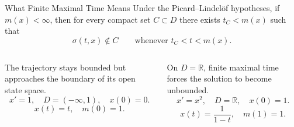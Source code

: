 \documentclass[aspectratio=169,11pt]{beamer}
\newcommand{\R}{\mathbb{R}}
\newcommand{\mstop}{m}
\newcommand{\flow}{\sigma}
\begin{document}
\begin{frame}{What Finite Maximal Time Means}
\small
Under the Picard--Lindel\"of hypotheses, if \(\mstop(x)<\infty\), then for every compact set \(C\subset D\) there exists \(t_C<\mstop(x)\) such that
\[
\boxed{\flow(t,x)\notin C
\qquad\text{whenever }t_C<t<\mstop(x).}
\]

\vspace{0.5em}
\begin{columns}[T,onlytextwidth]
\begin{tcolorbox}[colback=SoftPurple,colframe=LSUPurple,
  colbacktitle=LSUPurple,coltitle=white,title={Domain exit (bounded)},
  fonttitle=\bfseries,boxrule=0.9pt,arc=2mm,
  left=2mm,right=2mm,top=1.8mm,bottom=1.8mm]
\footnotesize
The trajectory stays bounded but approaches the boundary of its open state space.
\[
x'=1,\quad D=(-\infty,1),\quad x(0)=0.
\]
\[
\boxed{x(t)=t,\quad \mstop(0)=1.}
\]
\end{tcolorbox}

\begin{tcolorbox}[colback=SoftPurple,colframe=LSUPurple,
  colbacktitle=LSUPurple,coltitle=white,title={Finite-time blow-up},
  fonttitle=\bfseries,boxrule=0.9pt,arc=2mm,
  left=2mm,right=2mm,top=1.8mm,bottom=1.8mm]
\footnotesize
On \(D=\R\), finite maximal time forces the solution to become unbounded.
\[
x'=x^2,\quad D=\R,\quad x(0)=1.
\]
\[
\boxed{x(t)=\frac{1}{1-t},\quad \mstop(1)=1.}
\]
\end{tcolorbox}
\end{columns}
\end{frame}
\end{document}
